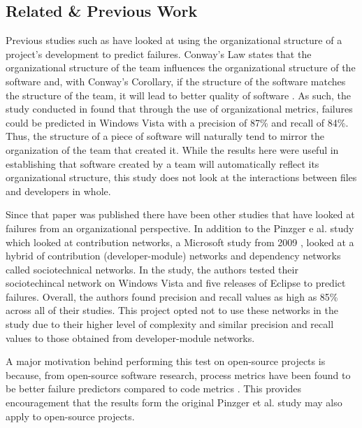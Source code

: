 \documentclass{sig-alternate-05-2015}
\begin{document}
\subsection{Related \& Previous Work}
Previous studies such as \cite{Nag:Org} have looked at using the organizational structure of a project's development to predict failures. Conway's Law states that the organizational structure of the team influences the organizational structure of the software and, with Conway's Corollary, if the structure of the software matches the structure of the team, it will lead to better quality of software \cite{oram:software}. As such, the study conducted in \cite{Nag:Org} found that through the use of organizational metrics, failures could be predicted in Windows Vista with a precision of 87\% and recall of 84\%. Thus, the structure of a piece of software will naturally tend to mirror the organization of the team that created it. While the results here were useful in establishing that software created by a team will automatically reflect its organizational structure, this study does not look at the interactions between files and developers in whole.

Since that paper was published there have been other studies that have looked at failures from an organizational perspective. In addition to the Pinzger e al. study \cite{pingzer:networks} which looked at contribution networks, a Microsoft study from 2009 \cite{Bird:Sociotechnical}, looked at a hybrid of contribution (developer-module) networks and dependency networks called sociotechnical networks. In the study, the authors tested their sociotechincal network on Windows Vista and five releases of Eclipse to predict failures. Overall, the authors found precision and recall values as high as 85\% across all of their studies. This project opted not to use these networks in the study due to their higher level of complexity and similar precision and recall values to those obtained from developer-module networks.

A major motivation behind performing this test on open-source projects is because, from open-source software research, process metrics have been found to be better failure predictors compared to code metrics \cite{rahman:metrics}. This provides encouragement that the results form the original Pinzger et al. study may also apply to open-source projects.
\end{document}
